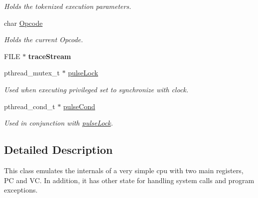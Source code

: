\begin{DoxyCompactItemize}
\begin{DoxyCompactList}\small\item\em \-Holds the tokenized execution parameters. \end{DoxyCompactList}\item 
\hypertarget{classcCPU_a897ce4ac1712c81e8c1a7e13733be8fc}{char \hyperlink{classcCPU_a897ce4ac1712c81e8c1a7e13733be8fc}{\-Opcode}}\label{d2/dc6/classcCPU_a897ce4ac1712c81e8c1a7e13733be8fc}

\begin{DoxyCompactList}\small\item\em \-Holds the current \-Opcode. \end{DoxyCompactList}\item 
\hypertarget{classcCPU_a5f4c42c44a803d6bd2c47103c3cec164}{\-F\-I\-L\-E $\ast$ {\bfseries trace\-Stream}}\label{d2/dc6/classcCPU_a5f4c42c44a803d6bd2c47103c3cec164}

\item 
\hypertarget{classcCPU_a1c5225262967be64645baa08d4b8e9bc}{pthread\-\_\-mutex\-\_\-t $\ast$ \hyperlink{classcCPU_a1c5225262967be64645baa08d4b8e9bc}{pulse\-Lock}}\label{d2/dc6/classcCPU_a1c5225262967be64645baa08d4b8e9bc}

\begin{DoxyCompactList}\small\item\em \-Used when executing privileged set to synchronize with clock. \end{DoxyCompactList}\item 
\hypertarget{classcCPU_ac86a0f942056eee52f2420c840bdd424}{pthread\-\_\-cond\-\_\-t $\ast$ \hyperlink{classcCPU_ac86a0f942056eee52f2420c840bdd424}{pulse\-Cond}}\label{d2/dc6/classcCPU_ac86a0f942056eee52f2420c840bdd424}

\begin{DoxyCompactList}\small\item\em \-Used in conjunction with \hyperlink{classcCPU_a1c5225262967be64645baa08d4b8e9bc}{pulse\-Lock}. \end{DoxyCompactList}\end{DoxyCompactItemize}


\subsection{\-Detailed \-Description}
\-This class emulates the internals of a very simple cpu with two main registers, \-P\-C and \-V\-C. \-In addition, it has other state for handling system calls and program exceptions. 

